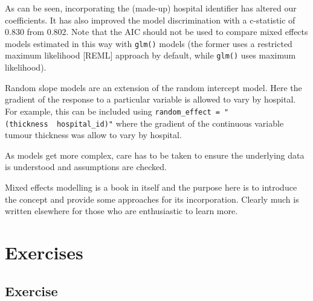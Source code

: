 \documentclass[
  12pt,
  krantz2]{krantz}
\begin{document}
\begin{table}[!h]

\caption{\label{tab:unnamed-chunk-39}Model metrics: multilevel (mixed effects) logistic regression.}
\centering
{}
\end{table}

As can be seen, incorporating the (made-up) hospital identifier has altered our coefficients.
It has also improved the model discrimination with a c-statistic of 0.830 from 0.802.
Note that the AIC should not be used to compare mixed effects models estimated in this way with \texttt{glm()} models (the former uses a restricted maximum likelihood {[}REML{]} approach by default, while \texttt{glm()} uses maximum likelihood).

Random slope models are an extension of the random intercept model.
Here the gradient of the response to a particular variable is allowed to vary by hospital.
For example, this can be included using \texttt{random\_effect\ =\ "(thickness\ \textbar{}\ hospital\_id)"} where the gradient of the continuous variable tumour thickness was allow to vary by hospital.

As models get more complex, care has to be taken to ensure the underlying data is understood and assumptions are checked.

Mixed effects modelling is a book in itself and the purpose here is to introduce the concept and provide some approaches for its incorporation.
Clearly much is written elsewhere for those who are enthusiastic to learn more.

\hypertarget{exercises-4}{%
\section{Exercises}\label{exercises-4}}

\hypertarget{chap09-ex1}{%
\subsection{Exercise}\label{chap09-ex1}}
\end{document}
